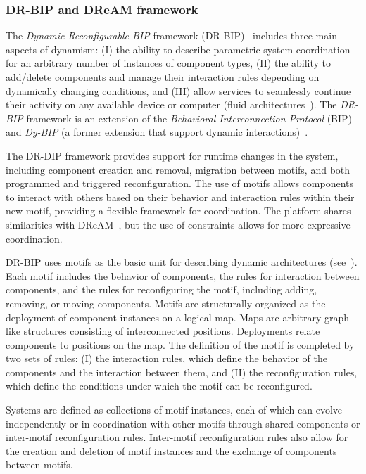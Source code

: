 \subsubsection{DR-BIP and DReAM framework}

The \emph{Dynamic Reconfigurable BIP} framework (DR-BIP)~\cite{10.1007/978-3-030-03424-5_20} includes three main aspects of dynamism: (I) the ability
to describe parametric system coordination for an arbitrary number of instances of component types, (II) the ability to add/delete components and
manage their interaction rules depending on dynamically changing conditions, and (III) allow services to seamlessly continue their activity on any
available device or computer (fluid architectures~\cite{taivalsaari2014liquid}).
The \emph{DR-BIP} framework is an extension of the \emph{Behavioral Interconnection Protocol} (BIP)~\cite{5719588} and
\emph{Dy-BIP} (a former extension that support dynamic interactions)~\cite{10.1007/978-3-642-30564-1_1}.

The DR-DIP framework provides support for runtime changes in the system, including component creation and removal, migration between motifs, and both
programmed and triggered reconfiguration.
The use of motifs allows components to interact with others based on their behavior and interaction rules within their new
motif, providing a flexible framework for coordination. The platform shares similarities with DReAM~\cite{de2020dream}, but the use of constraints
allows for more expressive coordination.

DR-BIP uses motifs as the basic unit for describing dynamic architectures (see~). Each motif includes the behavior of
components, the rules for interaction between components, and the rules for reconfiguring the motif, including adding, removing, or moving components.
Motifs are structurally organized as the deployment of component instances on a logical map.
Maps are arbitrary graph-like structures consisting of interconnected positions. Deployments relate components to positions on the map.
The definition of the motif is completed by two sets of rules: (I) the interaction rules, which define the behavior of the components and the
interaction between them, and (II) the reconfiguration rules, which define the conditions under which the motif can be reconfigured.

Systems are defined as collections of motif instances, each of which can evolve independently or in coordination with other motifs through shared
components or inter-motif reconfiguration rules. Inter-motif reconfiguration rules also allow for the creation and deletion of motif instances and
the exchange of components between motifs.

